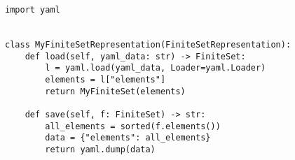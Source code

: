 \par\begin{minipage}{60ex}
\begin{verbatim}
import yaml


class MyFiniteSetRepresentation(FiniteSetRepresentation):
    def load(self, yaml_data: str) -> FiniteSet:
        l = yaml.load(yaml_data, Loader=yaml.Loader)
        elements = l["elements"]
        return MyFiniteSet(elements)

    def save(self, f: FiniteSet) -> str:
        all_elements = sorted(f.elements())
        data = {"elements": all_elements}
        return yaml.dump(data)
\end{verbatim}
\end{minipage}\par